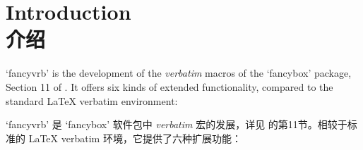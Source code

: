 \documentclass[twoside]{article}
\newcommand\FBoxPackage{`\textsf{fancybox}'}
\newcommand\FVrbPackage{`\textsf{fancyvrb}'}
\begin{document}
\section{Introduction\\介绍}

\FVrbPackage{} is the development of the \emph{verbatim} macros of the
\FBoxPackage{} package,  Section 11 of \cite{FancyBox}. It offers six kinds
of extended functionality, compared to the standard \LaTeX{}
\textsf{verbatim} environment:
%


\FVrbPackage{} 是 \FBoxPackage{} 软件包中 \emph{verbatim} 宏的发展，详见 \cite{FancyBox} 的第11节。相较于标准的 \LaTeX{} \textsf{verbatim} 环境，它提供了六种扩展功能：
\end{document}
